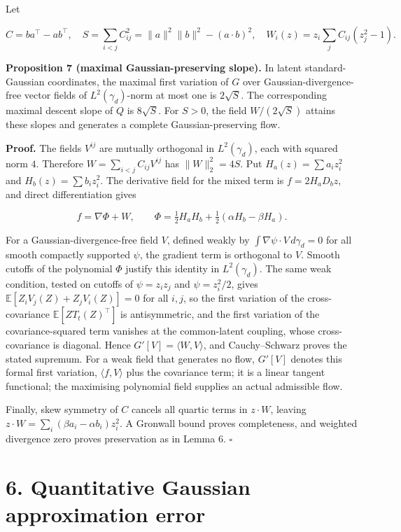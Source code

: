 \documentclass[
  british,
  11pt,
  a4paper,
]{article}
\begin{document}
Let

\[
C=ba^\top-ab^\top,\quad
S=\sum_{i<j}C_{ij}^2=\|a\|^2\|b\|^2-(a\cdot b)^2,\quad
W_i(z)=z_i\sum_j C_{ij}(z_j^2-1).                              \tag{13}
\]

\textbf{Proposition 7 (maximal Gaussian-preserving slope).} In latent
standard-Gaussian coordinates, the maximal first variation of \(G\) over
Gaussian-divergence-free vector fields of \(L^2(\gamma_d)\)-norm at most
one is \(2\sqrt S\). The corresponding maximal descent slope of \(Q\) is
\(8\sqrt S\). For \(S>0\), the field \(W/(2\sqrt S)\) attains these
slopes and generates a complete Gaussian-preserving flow.

\textbf{Proof.} The fields \(V^{ij}\) are mutually orthogonal in
\(L^2(\gamma_d)\), each with squared norm \(4\). Therefore
\(W=\sum_{i<j}C_{ij}V^{ij}\) has \(\|W\|_2^2=4S\). Put
\(H_a(z)=\sum a_i z_i^2\) and \(H_b(z)=\sum b_i z_i^2\). The derivative
field for the mixed term is \(f=2H_aD_bz\), and direct differentiation
gives

\[
f=\nabla\Phi+W,\qquad
\Phi=\tfrac12H_aH_b+\tfrac12(\alpha H_b-\beta H_a).               \tag{14}
\]

For a Gaussian-divergence-free field \(V\), defined weakly by
\(\int\nabla\psi\cdot V\,d\gamma_d=0\) for all smooth compactly
supported \(\psi\), the gradient term is orthogonal to \(V\). Smooth
cutoffs of the polynomial \(\Phi\) justify this identity in
\(L^2(\gamma_d)\). The same weak condition, tested on cutoffs of
\(\psi=z_iz_j\) and \(\psi=z_i^2/2\), gives
\(\mathbb E[Z_iV_j(Z)+Z_jV_i(Z)]=0\) for all \(i,j\), so the first
variation of the cross-covariance \(\mathbb E[ZT_t(Z)^\top]\) is
antisymmetric, and the first variation of the covariance-squared term
vanishes at the common-latent coupling, whose cross-covariance is
diagonal. Hence \(G'[V]=\langle W,V\rangle\), and Cauchy--Schwarz proves
the stated supremum. For a weak field that generates no flow, \(G'[V]\)
denotes this formal first variation, \(\langle f,V\rangle\) plus the
covariance term; it is a linear tangent functional; the maximising
polynomial field supplies an actual admissible flow.

Finally, skew symmetry of \(C\) cancels all quartic terms in
\(z\cdot W\), leaving \(z\cdot W=\sum_i(\beta a_i-\alpha b_i)z_i^2\). A
Gronwall bound proves completeness, and weighted divergence zero proves
preservation as in Lemma 6. \(\square\)

\section{6. Quantitative Gaussian approximation
error}\label{quantitative-gaussian-approximation-error}
\end{document}
